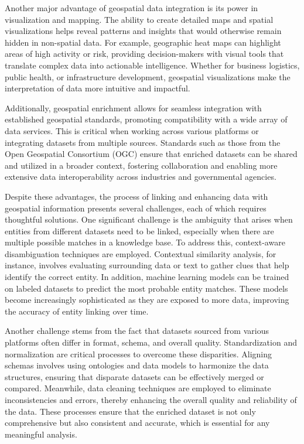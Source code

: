 Another major advantage of geospatial data integration is its power in visualization and mapping. The ability to create detailed maps and spatial visualizations helps reveal patterns and insights that would otherwise remain hidden in non-spatial data. For example, geographic heat maps can highlight areas of high activity or risk, providing decision-makers with visual tools that translate complex data into actionable intelligence. Whether for business logistics, public health, or infrastructure development, geospatial visualizations make the interpretation of data more intuitive and impactful.

Additionally, geospatial enrichment allows for seamless integration with established geospatial standards, promoting compatibility with a wide array of data services. This is critical when working across various platforms or integrating datasets from multiple sources. Standards such as those from the Open Geospatial Consortium (OGC) ensure that enriched datasets can be shared and utilized in a broader context, fostering collaboration and enabling more extensive data interoperability across industries and governmental agencies.

Despite these advantages, the process of linking and enhancing data with geospatial information presents several challenges, each of which requires thoughtful solutions. One significant challenge is the ambiguity that arises when entities from different datasets need to be linked, especially when there are multiple possible matches in a knowledge base. To address this, context-aware disambiguation techniques are employed. Contextual similarity analysis, for instance, involves evaluating surrounding data or text to gather clues that help identify the correct entity. In addition, machine learning models can be trained on labeled datasets to predict the most probable entity matches. These models become increasingly sophisticated as they are exposed to more data, improving the accuracy of entity linking over time.

Another challenge stems from the fact that datasets sourced from various platforms often differ in format, schema, and overall quality. Standardization and normalization are critical processes to overcome these disparities. Aligning schemas involves using ontologies and data models to harmonize the data structures, ensuring that disparate datasets can be effectively merged or compared. Meanwhile, data cleaning techniques are employed to eliminate inconsistencies and errors, thereby enhancing the overall quality and reliability of the data. These processes ensure that the enriched dataset is not only comprehensive but also consistent and accurate, which is essential for any meaningful analysis.

